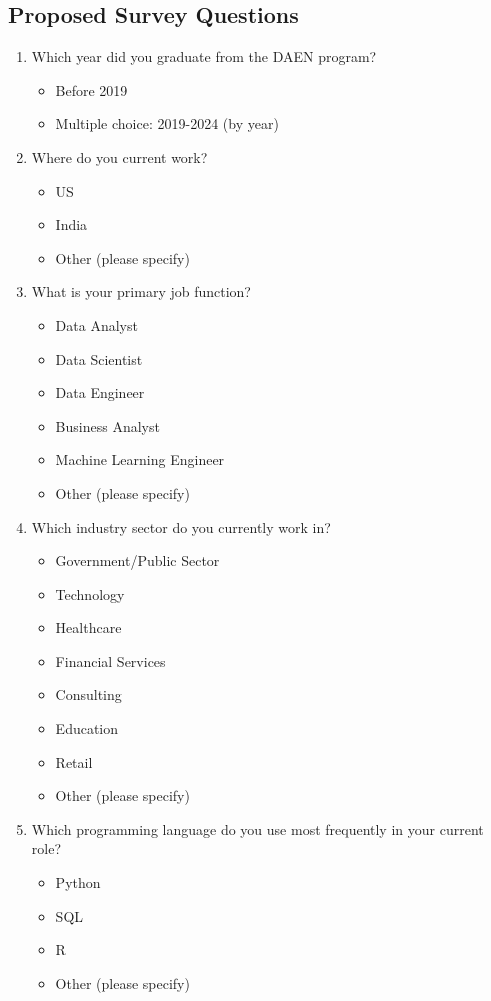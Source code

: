 \documentclass[12pt,a4paper]{article}
\begin{document}
\subsection{Proposed Survey Questions}
\begin{enumerate}
\item Which year did you graduate from the DAEN program?
\begin{itemize}
    \item Before 2019
    \item Multiple choice: 2019-2024 (by year)
\end{itemize}

\item Where do you current work?
\begin{itemize}
    \item US
    \item India
    \item Other (please specify)
\end{itemize}

\item What is your primary job function?
\begin{itemize}
    \item Data Analyst
    \item Data Scientist
    \item Data Engineer
    \item Business Analyst
    \item Machine Learning Engineer
    \item Other (please specify)
\end{itemize}

\item Which industry sector do you currently work in?
\begin{itemize}
    \item Government/Public Sector
    \item Technology
    \item Healthcare
    \item Financial Services
    \item Consulting
    \item Education
    \item Retail
    \item Other (please specify)
\end{itemize}

\item Which programming language do you use most frequently in your current role?
\begin{itemize}
    \item Python
    \item SQL
    \item R
    \item Other (please specify)
\end{itemize}


\end{enumerate}
\end{document}
